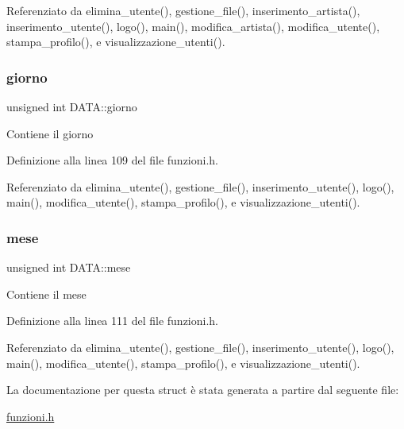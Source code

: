 Referenziato da elimina\+\_\+utente(), gestione\+\_\+file(), inserimento\+\_\+artista(), inserimento\+\_\+utente(), logo(), main(), modifica\+\_\+artista(), modifica\+\_\+utente(), stampa\+\_\+profilo(), e visualizzazione\+\_\+utenti().

\mbox{\label{struct_d_a_t_a_a5b7ee538f851d6654690c7abd5a73e95}} 
\subsubsection{\texorpdfstring{giorno}{giorno}}
{\footnotesize\ttfamily unsigned int D\+A\+T\+A\+::giorno}

Contiene il giorno 

Definizione alla linea 109 del file funzioni.\+h.



Referenziato da elimina\+\_\+utente(), gestione\+\_\+file(), inserimento\+\_\+utente(), logo(), main(), modifica\+\_\+utente(), stampa\+\_\+profilo(), e visualizzazione\+\_\+utenti().

\mbox{\label{struct_d_a_t_a_a01ae59e2eaf050acfab59d94732ab535}} 
\subsubsection{\texorpdfstring{mese}{mese}}
{\footnotesize\ttfamily unsigned int D\+A\+T\+A\+::mese}

Contiene il mese 

Definizione alla linea 111 del file funzioni.\+h.



Referenziato da elimina\+\_\+utente(), gestione\+\_\+file(), inserimento\+\_\+utente(), logo(), main(), modifica\+\_\+utente(), stampa\+\_\+profilo(), e visualizzazione\+\_\+utenti().



La documentazione per questa struct è stata generata a partire dal seguente file\+:\begin{DoxyCompactItemize}
\item 
\hyperlink{funzioni_8h}{funzioni.\+h}\end{DoxyCompactItemize}
